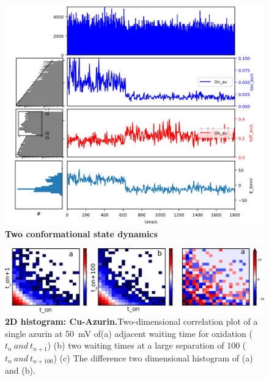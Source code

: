 \paragraph*{}
\begin{figure}
  \centering
  \includegraphics[width=\textwidth]{dynamic_trace_steps}
  \caption{\textbf{Two conformational state dynamics}}
  \label{SIfig:dynamic_trace_steps}
\end{figure}
\begin{figure}
  \centering
  \includegraphics[width=\textwidth]{Figure_4_on_off_2D_100mV}
  \caption{\textbf{2D histogram: Cu-Azurin.}Two-dimensional correlation plot of a single azurin at \SI{50}{\mV} of(a) adjacent waiting time for oxidation ($t_{n}~and~t_{n+1}$) (b) two waiting times at a large separation of 100 ($t_{n}~and~t_{n+100}$) (c) The difference two dimensional histogram of (a) and (b).}
  \label{SIfig:onoff2D}
\end{figure}
